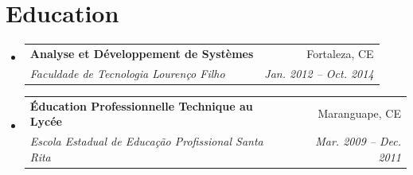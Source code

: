 \documentclass[letterpaper,11pt]{article}
\makeatletter
\newcommand{\resumeItem}[2]{
  \item\small{
    \textbf{#1}{: #2 \vspace{-2pt}}
  }
}
\newcommand{\resumeSubheading}[4]{
  \vspace{-1pt}\item
    \begin{tabular*}{0.97\textwidth}[t]{l@{\extracolsep{\fill}}r}
      \textbf{#1} & #2 \\
      \textit{\small#3} & \textit{\small #4} \\
    \end{tabular*}\vspace{-5pt}
}
\newcommand{\resumeSubSubheading}[2]{
    \begin{tabular*}{0.97\textwidth}{l@{\extracolsep{\fill}}r}
      \textit{\small#1} & \textit{\small #2} \\
    \end{tabular*}\vspace{-5pt}
}
\newcommand{\resumeSubItem}[2]{\resumeItem{#1}{#2}\vspace{-4pt}}
\newcommand{\resumeSubHeadingListStart}{\begin{itemize}[leftmargin=*]}
\newcommand{\resumeSubHeadingListEnd}{\end{itemize}}
\newcommand{\resumeItemListStart}{\begin{itemize}}
\newcommand{\resumeItemListEnd}{\end{itemize}\vspace{-5pt}}
\makeatother
\begin{document}
\section{Education}
\resumeSubHeadingListStart
\resumeSubheading
{Analyse et Développement de Systèmes}{Fortaleza, CE}
{Faculdade de Tecnologia Lourenço Filho}{Jan. 2012 -- Oct. 2014}
\resumeSubheading
{Éducation Professionnelle Technique au Lycée}{Maranguape, CE}
{Escola Estadual de Educação Profissional Santa Rita}{Mar. 2009 -- Dec. 2011}
\resumeSubHeadingListEnd


%
%
\end{document}
